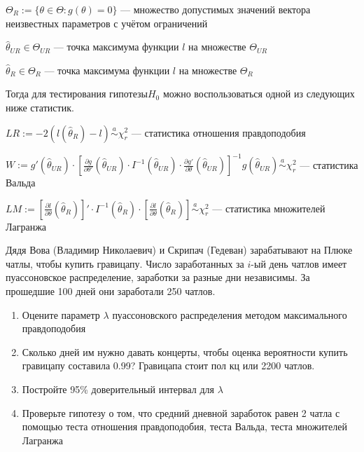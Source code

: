 \documentclass[pdftex,11pt,openany]{book}\usepackage[]{graphicx}\usepackage[]{color}
\begin{document}
\begin{problemtext}
$\Theta_{R} := \{ \theta \in \Theta: g(\theta) = 0\}$ --- множество допустимых значений вектора неизвестных параметров с учётом ограничений

$\hat{\theta}_{UR} \in \Theta_{UR}$ --- точка максимума функции $l$ на множестве $\Theta_{UR}$

$\hat{\theta}_{R} \in \Theta_{R}$ --- точка максимума функции $l$ на множестве $\Theta_{R}$

Тогда для тестирования гипотезы$H_0$ можно воспользоваться одной из следующих ниже статистик.

$LR := -2(l(\hat{\theta}_{R}) - l) \overset{a}{\sim} \chi^2_r$ --- статистика отношения правдоподобия

$W := g'(\hat{\theta}_{UR}) \cdot \left[ \frac{\partial g}{\partial \theta'}(\hat{\theta}_{UR}) \cdot I^{-1}(\hat{\theta}_{UR}) \cdot \frac{\partial g'}{\partial \theta}(\hat{\theta}_{UR}) \right]^{-1} g(\hat{\theta}_{UR}) \overset{a}{\sim} \chi^2_r$ --- статистика Вальда

$LM := \left[ \frac{\partial l}{\partial \theta}(\hat{\theta}_{R}) \right]' \cdot I^{-1}(\hat{\theta}_{R}) \cdot \left[ \frac{\partial l}{\partial \theta}(\hat{\theta}_{R}) \right] \overset{a}{\sim} \chi^2_r$ --- статистика множителей Лагранжа
\end{problemtext}


\begin{problem}
Дядя Вова (Владимир Николаевич) и Скрипач (Гедеван) зарабатывают на Плюке чатлы, чтобы купить гравицапу. Число заработанных за $i$-ый день чатлов имеет пуассоновское распределение, заработки за разные дни независимы. За прошедшие 100 дней они заработали 250 чатлов. 
\begin{enumerate}
\item Оцените параметр $\lambda$ пуассоновского распределения методом максимального правдоподобия
\item Сколько дней им нужно давать концерты, чтобы оценка вероятности купить гравицапу составила 0.99? Гравицапа стоит пол кц или 2200 чатлов.
\item Постройте 95\% доверительный интервал для $\lambda$
\item Проверьте гипотезу о том, что средний дневной заработок равен 2 чатла с помощью теста отношения правдоподобия, теста Вальда, теста множителей Лагранжа
\end{enumerate}
\end{problem}
\begin{solution}
\end{solution}
\end{document}
